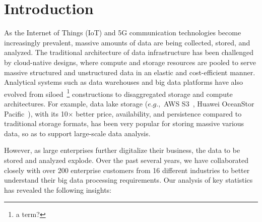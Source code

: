 \section{Introduction} 
\label{sec:intro}


As the Internet of Things (IoT) and 5G communication technologies become increasingly prevalent, massive amounts of data are being collected, stored, and analyzed.
 The traditional architecture of data infrastructure  has been challenged by cloud-native designs, where compute and storage resources are pooled to serve massive structured and unstructured data in an elastic and cost-efficient manner.
  Analytical systems such as data warehouses and big data platforms have also evolved from siloed~\footnote{a term?} constructions to disaggregated storage and compute architectures. For example, data lake storage ($e.g.,$ AWS S3~\cite{}, Huawei OceanStor Pacific~\cite{}), with its 10$\times$ better price, availability, and persistence compared to traditional storage formats, has been very popular for storing massive various data, so as to support large-scale data analysis.


However, as large enterprises further digitalize their business, the data to be stored and analyzed explode. Over the past several years, we have collaborated closely with over 200 enterprise customers from 16 different industries to better understand their big data processing requirements. Our analysis of key statistics has revealed the following insights:

